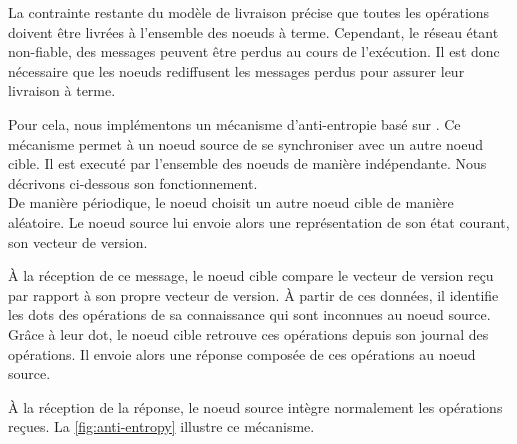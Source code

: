 \label{sec:mute-anti-entropy}

La contrainte restante du modèle de livraison précise que toutes les opérations doivent être livrées à l'ensemble des noeuds à terme.
Cependant, le réseau étant non-fiable, des messages peuvent être perdus au cours de l'exécution.
Il est donc nécessaire que les noeuds rediffusent les messages perdus pour assurer leur livraison à terme.

Pour cela, nous implémentons un mécanisme d'anti-entropie basé sur \cite{1983-anti-entropy-vv}.
Ce mécanisme permet à un noeud source de se synchroniser avec un autre noeud cible.
Il est executé par l'ensemble des noeuds de manière indépendante.
Nous décrivons ci-dessous son fonctionnement.\\

De manière périodique, le noeud choisit un autre noeud cible de manière aléatoire.
Le noeud source lui envoie alors une représentation de son état courant, \ie son vecteur de version.

À la réception de ce message, le noeud cible compare le vecteur de version reçu par rapport à son propre vecteur de version.
À partir de ces données, il identifie les dots des opérations de sa connaissance qui sont inconnues au noeud source.
Grâce à leur dot, le noeud cible retrouve ces opérations depuis son journal des opérations.
Il envoie alors une réponse composée de ces opérations au noeud source.

À la réception de la réponse, le noeud source intègre normalement les opérations reçues.
La \autoref{fig:anti-entropy} illustre ce mécanisme.\\

